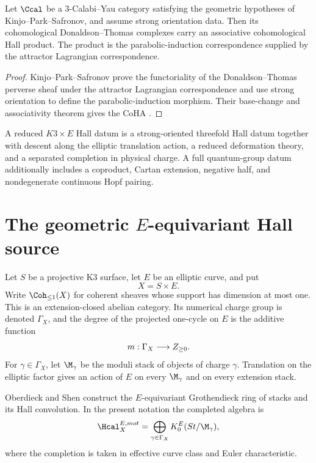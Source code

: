 \begin{theorem}
Let $\Ccal$ be a $3$-Calabi--Yau category satisfying the geometric hypotheses of Kinjo--Park--Safronov, and assume strong orientation data.  Then its cohomological Donaldson--Thomas complexes carry an associative cohomological Hall product.  The product is the parabolic-induction correspondence supplied by the attractor Lagrangian correspondence.
\end{theorem}
\begin{proof}
Kinjo--Park--Safronov prove the functoriality of the Donaldson--Thomas perverse sheaf under the attractor Lagrangian correspondence and use strong orientation to define the parabolic-induction morphism.  Their base-change and associativity theorem gives the CoHA \cite{KPS}.
\end{proof}

\begin{definition}
A reduced $K3\times E$ Hall datum is a strong-oriented threefold Hall datum together with descent along the elliptic translation action, a reduced deformation theory, and a separated completion in physical charge.  A full quantum-group datum additionally includes a coproduct, Cartan extension, negative half, and nondegenerate continuous Hopf pairing.
\end{definition}

\chapter{The geometric \texorpdfstring{$E$}{E}-equivariant Hall source}
Let $S$ be a projective K3 surface, let $E$ be an elliptic curve, and put
\[
 X=S\times E.
\]
Write $\Coh_{\leq1}(X)$ for coherent sheaves whose support has dimension at most one.  This is an extension-closed abelian category.  Its numerical charge group is denoted $\Gamma_X$, and the degree of the projected one-cycle on $E$ is the additive function
\[
 m:\Gamma_X\longrightarrow Z_{\geq0}.
\]
For $\gamma\in\Gamma_X$, let $\M_\gamma$ be the moduli stack of objects of charge $\gamma$.  Translation on the elliptic factor gives an action of $E$ on every $\M_\gamma$ and on every extension stack.

Oberdieck and Shen construct the $E$-equivariant Grothendieck ring of stacks and its Hall convolution.  In the present notation the completed algebra is
\[
 \Hcal_X^{E,\mathrm{mot}}
 =\widehat\bigoplus_{\gamma\in\Gamma_X}
 K_0^E(\operatorname{St}/\M_\gamma),
\]
where the completion is taken in effective curve class and Euler characteristic.

